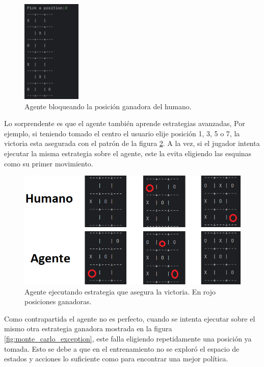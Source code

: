 \begin{figure}[htbp]
	\centering
	\includegraphics[width=0.25\textwidth]{./Figures/monte_carlo_block.png}
	\caption{Agente bloqueando la posición ganadora del humano.}
	\label{fig:monte_carlo_block}
\end{figure}

Lo sorprendente es que el agente también aprende estrategias avanzadas, Por ejemplo, si teniendo tomado el centro el usuario elije posición 1, 3, 5 o 7, la victoria esta asegurada con el patrón de la figura \ref{fig:monte_carlo_advanced}. A la vez, si el jugador intenta ejecutar la misma estrategia sobre el agente, este la evita eligiendo las esquinas como su primer movimiento.

\begin{figure}[htbp]
	\centering
	\includegraphics[width=\textwidth]{./Figures/monte_carlo_advanced.png}
	\caption{Agente ejecutando estrategia que asegura la victoria. En rojo posiciones ganadoras.}
	\label{fig:monte_carlo_advanced}
\end{figure}

Como contrapartida el agente no es perfecto, cuando se intenta ejecutar sobre el mismo otra estrategia ganadora mostrada en la figura \ref{fig:monte_carlo_exception}, este falla eligiendo repetidamente una posición ya tomada. Esto se debe a que en el entrenamiento no se exploró el espacio de estados y acciones lo suficiente como para encontrar una mejor política.

